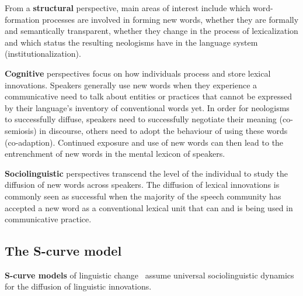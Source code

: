 \documentclass[
  a4paper,
  abstract=on,
  captions=tableabove
  ]{scrartcl}
\renewcommand{\hw}[1]{\textbf{#1}}
\begin{document}
  From a \hw{structural} perspective, main areas of interest include which word-formation processes are involved in forming new words, whether they are formally and semantically transparent, whether they change in the process of lexicalization and which status the resulting neologisms have in the language system (institutionalization). \parencite[e.g.][]{Bauer1983EnglishWordformation, Lipka2005LexicalizationInstitutionalization}

  \hw{Cognitive} perspectives focus on how individuals process and store lexical innovations. Speakers generally use new words when they experience a communicative need to talk about entities or practices that cannot be expressed by their language's inventory of conventional words yet. In order for neologisms to successfully diffuse, speakers need to successfully negotiate their meaning (co-semiosis) in discourse, others need to adopt the behaviour of using these words (co-adaption). Continued exposure and use of new words can then lead to the entrenchment of new words in the mental lexicon of speakers.~\parencite{Schmid2008NewWords}

  \hw{Sociolinguistic} perspectives transcend the level of the individual to study the diffusion of new words across speakers. The diffusion of lexical innovations is commonly seen as successful when the majority of the speech community has accepted a new word as a conventional lexical unit that can and is being used in communicative practice.


  \subsection{The S-curve model}
    \label{subsec:s-curve-model}

  \hw{S-curve models} of linguistic change~\parencite{Milroy1992LinguisticVariation, Nevalainen2015DescriptiveAdequacy, Labov2007TransmissionDiffusion} assume universal sociolinguistic dynamics for the diffusion of linguistic innovations.
\end{document}
